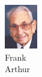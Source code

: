 \begin{figure}[H]
\begin{subfigure}[b]{0.1\textwidth}
                \includegraphics[width=\textwidth]{mugs/ArthurFrank}
                \caption*{Frank \\ Arthur}
        \end{subfigure}
                ~ %
        \begin{subfigure}[b]{0.1\textwidth}

\end{subfigure}
\end{figure}
